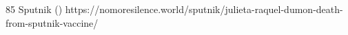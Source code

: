           {}
          {85}
          {Sputnik}
          {}
          {
             ()
          }
          {https://nomoresilence.world/sputnik/julieta-raquel-dumon-death-from-sputnik-vaccine/}

